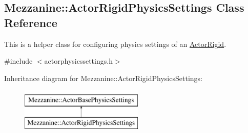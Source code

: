 \hypertarget{classMezzanine_1_1ActorRigidPhysicsSettings}{
\subsection{Mezzanine::ActorRigidPhysicsSettings Class Reference}
\label{classMezzanine_1_1ActorRigidPhysicsSettings}
}


This is a helper class for configuring physics settings of an \hyperlink{classMezzanine_1_1ActorRigid}{ActorRigid}.  




{\ttfamily \#include $<$actorphysicssettings.h$>$}

Inheritance diagram for Mezzanine::ActorRigidPhysicsSettings:\begin{figure}[H]
\begin{center}
\leavevmode
\includegraphics[height=2.000000cm]{classMezzanine_1_1ActorRigidPhysicsSettings}
\end{center}
\end{figure}
